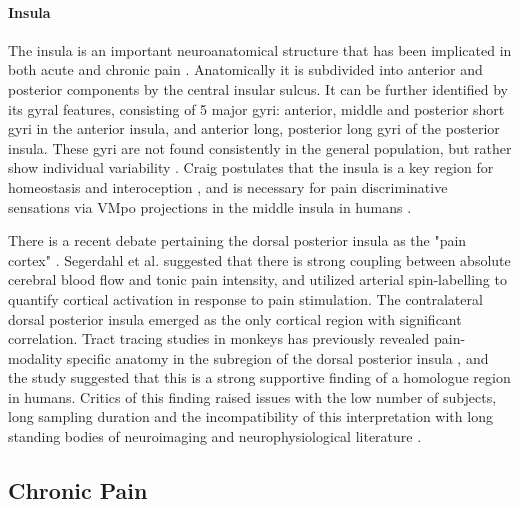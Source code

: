 \paragraph{Insula}

The insula is an important neuroanatomical structure that has been implicated in both acute \cite{Lorenz2005,Starr2009} and chronic pain \cite{May2008,Jensen2016}. Anatomically it is subdivided into anterior and posterior components by the central insular sulcus. It can be further identified by its gyral features, consisting of 5 major gyri: anterior, middle and posterior short gyri in the anterior insula, and anterior long, posterior long gyri of the posterior insula. These gyri are not found consistently in the general population, but rather show individual variability \cite{Rosen2015}. Craig postulates that the insula is a key region for homeostasis and interoception \cite{Craig2003b}, and is necessary for pain discriminative sensations via VMpo projections in the middle insula in humans \cite{Craig2003a}. 

There is a recent debate pertaining the dorsal posterior insula as the "pain cortex" \cite{Segerdahl2015a}. Segerdahl et al. suggested that there is strong coupling between absolute cerebral blood flow and tonic pain intensity, and utilized arterial spin-labelling to quantify cortical activation in response to pain stimulation. The contralateral dorsal posterior insula emerged as the only cortical region with significant correlation. Tract tracing studies in monkeys has previously revealed pain-modality specific anatomy in the subregion of the dorsal posterior insula \cite{Craig2014}, and the study suggested that this is a strong supportive finding of a homologue region in humans. Critics of this finding raised issues with the low number of subjects, long sampling duration and the incompatibility of this interpretation with long standing bodies of neuroimaging and neurophysiological literature \cite{Davis2015}. 

\subsection{Chronic Pain}


